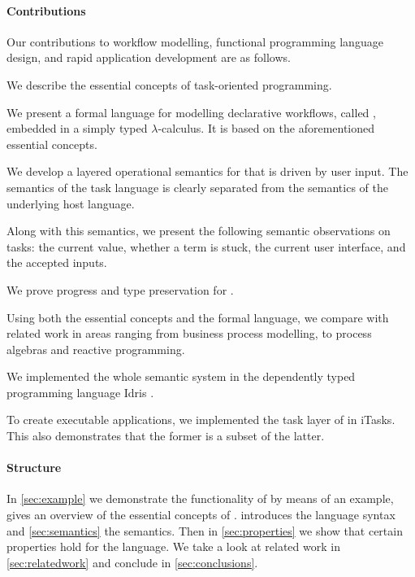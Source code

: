 \paragraph{Contributions}

Our contributions to workflow modelling, functional programming language design, and rapid application development are as follows.


\begin{enumerate*}
  \item
    We describe the essential concepts of task-oriented programming.
  \item
    We present a formal language for modelling declarative workflows, called \TOPHAT, embedded in a simply typed $\lambda$-calculus.
    It is based on the aforementioned essential \TOP concepts.
  \item
    We develop a layered operational semantics for \TOPHAT that is driven by user input.
    The semantics of the task language is clearly separated from the semantics of the underlying host language.
  \item
    Along with this semantics, we present the following semantic observations on tasks:
    the current value, whether a term is stuck, the current user interface, and the accepted inputs.
  \item
    We prove progress and type preservation for \TOPHAT.
  \item
    Using both the essential concepts and the formal language, we compare \TOP with related work in areas ranging from business process modelling, to process algebras and reactive programming.
  \item
    We implemented the whole semantic system in the dependently typed programming language Idris \cite{journals/jfp/Brady13}.
  \item
    To create executable applications, we implemented the task layer of \TOPHAT in iTasks.
    This also demonstrates that the former is a subset of the latter.
\end{enumerate*}


\paragraph{Structure}

In \cref{sec:example} we demonstrate the functionality of \TOPHAT by means of an example,
 gives an overview of the essential concepts of \TOP.
 introduces the \TOPHAT language syntax
and \cref{sec:semantics} the semantics.
Then in \cref{sec:properties} we show that certain properties hold for the language.
We take a look at related work in \cref{sec:relatedwork}
and conclude in \cref{sec:conclusions}.
